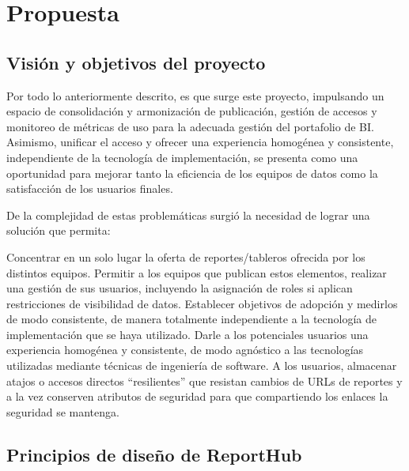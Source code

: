 \chapter{Propuesta}
\section{Visión y objetivos del proyecto}

Por todo lo anteriormente descrito, es que surge este proyecto, impulsando un espacio de consolidación y armonización de publicación, gestión de accesos y monitoreo de métricas de uso para la adecuada gestión del portafolio de BI. Asimismo, unificar el acceso y ofrecer una experiencia homogénea y consistente, independiente de la tecnología de implementación, se presenta como una oportunidad para mejorar tanto la eficiencia de los equipos de datos como la satisfacción de los usuarios finales.

De la complejidad de estas problemáticas surgió la necesidad de lograr una solución que permita:

Concentrar en un solo lugar la oferta de reportes/tableros ofrecida por los distintos equipos.
Permitir a los equipos que publican estos elementos, realizar una gestión de sus usuarios, incluyendo la asignación de roles si aplican restricciones de visibilidad de datos.
Establecer objetivos de adopción y medirlos de modo consistente, de manera totalmente independiente a la tecnología de implementación que se haya utilizado.
Darle a los potenciales usuarios una experiencia homogénea y consistente, de modo agnóstico a las tecnologías utilizadas mediante técnicas de ingeniería de software.
A los usuarios, almacenar atajos o accesos directos “resilientes” que resistan cambios de URLs de reportes y a la vez conserven atributos de seguridad para que compartiendo los enlaces la seguridad se mantenga.

\section{Principios de diseño de ReportHub}

